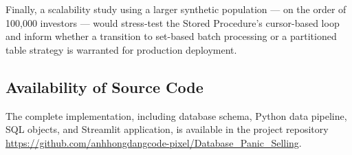 Finally, a scalability study using a larger synthetic population — on the order of 100,000 investors — would stress-test the Stored Procedure's cursor-based loop and inform whether a transition to set-based batch processing or a partitioned table strategy is warranted for production deployment.

\subsection{Availability of Source Code}
The complete implementation, including database schema, Python data pipeline, SQL objects, and Streamlit application, is available in the project repository \url{https://github.com/anhhongdangcode-pixel/Database_Panic_Selling}.